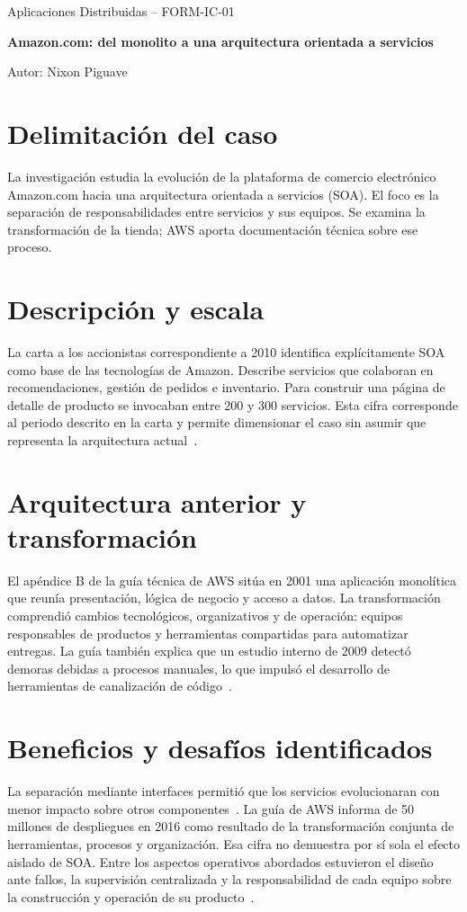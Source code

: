 \documentclass[11pt,a4paper]{article}
\begin{document}
\begin{center}
{\small Aplicaciones Distribuidas -- FORM-IC-01\par}
\vspace{0.4em}
{\Large\bfseries Amazon.com: del monolito a una arquitectura orientada a servicios\par}
\vspace{0.4em}
{\small Autor: Nixon Piguave\par}
\end{center}

\section*{Delimitación del caso}
La investigación estudia la evolución de la plataforma de comercio electrónico Amazon.com hacia una arquitectura orientada a servicios (SOA). El foco es la separación de responsabilidades entre servicios y sus equipos. Se examina la transformación de la tienda; AWS aporta documentación técnica sobre ese proceso.

\section*{Descripción y escala}
La carta a los accionistas correspondiente a 2010 identifica explícitamente SOA como base de las tecnologías de Amazon. Describe servicios que colaboran en recomendaciones, gestión de pedidos e inventario. Para construir una página de detalle de producto se invocaban entre 200 y 300 servicios. Esta cifra corresponde al periodo descrito en la carta y permite dimensionar el caso sin asumir que representa la arquitectura actual~\cite{amazon2010letter}.

\section*{Arquitectura anterior y transformación}
El apéndice B de la guía técnica de AWS sitúa en 2001 una aplicación monolítica que reunía presentación, lógica de negocio y acceso a datos. La transformación comprendió cambios tecnológicos, organizativos y de operación: equipos responsables de productos y herramientas compartidas para automatizar entregas. La guía también explica que un estudio interno de 2009 detectó demoras debidas a procesos manuales, lo que impulsó el desarrollo de herramientas de canalización de código~\cite[apéndice B, pp. 17--19]{aws2021cee}.

\section*{Beneficios y desafíos identificados}
La separación mediante interfaces permitió que los servicios evolucionaran con menor impacto sobre otros componentes~\cite{amazon2010letter}. La guía de AWS informa de 50 millones de despliegues en 2016 como resultado de la transformación conjunta de herramientas, procesos y organización. Esa cifra no demuestra por sí sola el efecto aislado de SOA. Entre los aspectos operativos abordados estuvieron el diseño ante fallos, la supervisión centralizada y la responsabilidad de cada equipo sobre la construcción y operación de su producto~\cite[apéndice B, pp. 18--19]{aws2021cee}.

\clearpage
\printbibliography[title={Referencias}]
\end{document}
